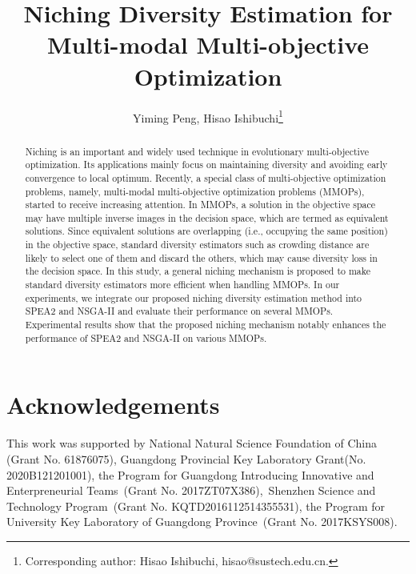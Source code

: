 \documentclass[runningheads]{llncs}
\begin{document}
\title{Niching Diversity Estimation for Multi-modal Multi-objective Optimization}
\author{Yiming Peng, Hisao Ishibuchi\thanks{Corresponding author: Hisao Ishibuchi, hisao@sustech.edu.cn.}}
%
\maketitle              %
%
\begin{abstract}
    Niching is an important and widely used technique in evolutionary multi-objective optimization. Its applications mainly focus on maintaining diversity and avoiding early convergence to local optimum. Recently, a special class of multi-objective optimization problems, namely, multi-modal multi-objective optimization problems (MMOPs), started to receive increasing attention. In MMOPs, a solution in the objective space may have multiple inverse images in the decision space, which are termed as equivalent solutions. Since equivalent solutions are overlapping (i.e., occupying the same position) in the objective space, standard diversity estimators such as crowding distance are likely to select one of them and discard the others, which may cause diversity loss in the decision space. In this study, a general niching mechanism is proposed to make standard diversity estimators more efficient when handling MMOPs. In our experiments, we integrate our proposed niching diversity estimation method into SPEA2 and NSGA-II and evaluate their performance on several MMOPs. Experimental results show that the proposed niching mechanism notably enhances the performance of SPEA2 and NSGA-II on various MMOPs.

\end{abstract}






\section*{Acknowledgements}
This work was supported by National Natural Science Foundation of China (Grant No. 61876075), Guangdong Provincial Key Laboratory Grant(No. 2020B121201001), the Program for Guangdong Introducing Innovative and Enterpreneurial Teams (Grant No. 2017ZT07X386), Shenzhen Science and Technology Program (Grant No. KQTD2016112514355531), the Program for University Key Laboratory of Guangdong Province (Grant No. 2017KSYS008).
%
%


\end{document}
